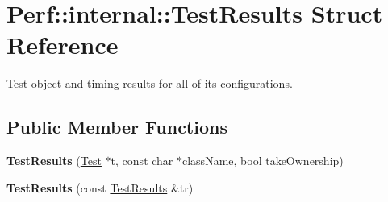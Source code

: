 \hypertarget{structPerf_1_1internal_1_1TestResults}{}\section{Perf\+:\+:internal\+:\+:Test\+Results Struct Reference}
\label{structPerf_1_1internal_1_1TestResults}


\hyperlink{classPerf_1_1Test}{Test} object and timing results for all of its configurations.  


\subsection*{Public Member Functions}
\begin{DoxyCompactItemize}
\item 
\hypertarget{structPerf_1_1internal_1_1TestResults_a778ab6e514eda06e22d84a8d1abd6c0a}{}{\bfseries Test\+Results} (\hyperlink{classPerf_1_1Test}{Test} $\ast$t, const char $\ast$class\+Name, bool take\+Ownership)\label{structPerf_1_1internal_1_1TestResults_a778ab6e514eda06e22d84a8d1abd6c0a}

\item 
\hypertarget{structPerf_1_1internal_1_1TestResults_a743e2cca5ebef206be088d2fce781eb5}{}{\bfseries Test\+Results} (const \hyperlink{structPerf_1_1internal_1_1TestResults}{Test\+Results} \&tr)\label{structPerf_1_1internal_1_1TestResults_a743e2cca5ebef206be088d2fce781eb5}

\end{DoxyCompactItemize}
